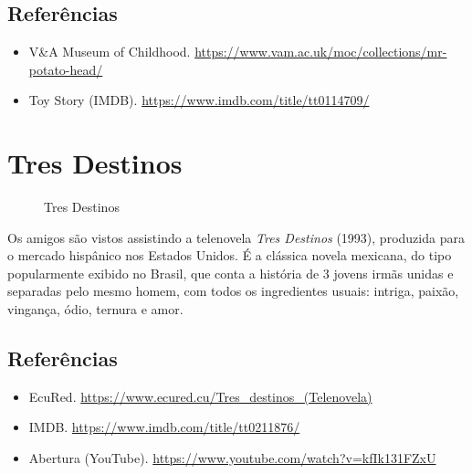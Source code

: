 \hypertarget{referuxeancias}{%
\subsection{Referências}\label{referuxeancias}}

\begin{itemize}
\tightlist
\item
  \sloppy V&A Museum of Childhood. \url{https://www.vam.ac.uk/moc/collections/mr-potato-head/}
\item
  \sloppy Toy Story (IMDB). \url{https://www.imdb.com/title/tt0114709/}
\end{itemize}

\hypertarget{tres-destinos}{%
\section{Tres Destinos}\label{tres-destinos}}

\begin{figure}
  \centering
    \caption{Tres Destinos\label{fig:tres-destinos}}
\end{figure}

Os amigos são vistos assistindo a telenovela \emph{Tres Destinos}
(1993), produzida para o mercado hispânico nos Estados Unidos. É a
clássica novela mexicana, do tipo popularmente exibido no Brasil, que
conta a história de 3 jovens irmãs unidas e separadas pelo mesmo homem,
com todos os ingredientes usuais: intriga, paixão, vingança, ódio,
ternura e amor.

\hypertarget{referuxeancias-1}{%
\subsection{Referências}\label{referuxeancias-1}}

\begin{itemize}
\tightlist
\item
  \sloppy EcuRed. \url{https://www.ecured.cu/Tres_destinos_(Telenovela)}
\item
  \sloppy IMDB. \url{https://www.imdb.com/title/tt0211876/}
\item
  \sloppy Abertura (YouTube). \url{https://www.youtube.com/watch?v=kfIk131FZxU}
\end{itemize}

